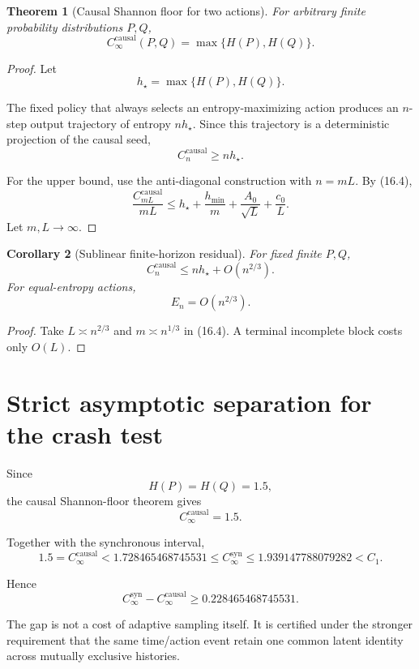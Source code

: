 \documentclass[11pt,a4paper]{article}
\newtheorem{theorem}{Theorem}[section]
\newtheorem{corollary}[theorem]{Corollary}
\newcommand{\Ccausal}{C^{\mathrm{causal}}}
\newcommand{\CinfSyn}{C_{\infty}^{\mathrm{syn}}}
\newcommand{\CinfCausal}{C_{\infty}^{\mathrm{causal}}}
\newcommand{\1}{\mathbf 1}
\begin{document}
\begin{theorem}[Causal Shannon floor for two actions]
For arbitrary finite probability distributions \(P,Q\),
\[
\boxed{
\CinfCausal(P,Q)
=
\max\{H(P),H(Q)\}.
}
\tag{17.1}
\]
\end{theorem}

\begin{proof}
Let
\[
h_\star=\max\{H(P),H(Q)\}.
\]

The fixed policy that always selects an entropy-maximizing action
produces an \(n\)-step output trajectory of entropy \(nh_\star\).
Since this trajectory is a deterministic projection of the causal seed,
\[
\Ccausal_n\ge nh_\star.
\]

For the upper bound, use the anti-diagonal construction with
\(n=mL\).
By (16.4),
\[
\frac{\Ccausal_{mL}}{mL}
\le
h_\star
+
\frac{h_{\min}}m
+
\frac{A_0}{\sqrt L}
+
\frac{c_0}{L}.
\]
Let \(m,L\to\infty\).
\end{proof}

\begin{corollary}[Sublinear finite-horizon residual]
For fixed finite \(P,Q\),
\[
\boxed{
\Ccausal_n
\le
nh_\star+O(n^{2/3}).
}
\tag{17.2}
\]
For equal-entropy actions,
\[
\boxed{
E_n=O(n^{2/3}).
}
\tag{17.3}
\]
\end{corollary}

\begin{proof}
Take \(L\asymp n^{2/3}\) and \(m\asymp n^{1/3}\) in
(16.4).
A terminal incomplete block costs only \(O(L)\).
\end{proof}


\section{Strict asymptotic separation for the crash test}

Since
\[
H(P)=H(Q)=1.5,
\]
the causal Shannon-floor theorem gives
\[
\boxed{
\CinfCausal=1.5.
}
\tag{18.1}
\]

Together with the synchronous interval,
\[
\boxed{
1.5
=
\CinfCausal
<
1.728465468745531
\le
\CinfSyn
\le
1.939147788079282
<
C_1.
}
\tag{18.2}
\]

Hence
\[
\boxed{
\CinfSyn-\CinfCausal
\ge
0.228465468745531.
}
\tag{18.3}
\]

The gap is not a cost of adaptive sampling itself.
It is certified under the stronger requirement that the same
time/action event retain one common latent identity across mutually
exclusive histories.
\end{document}
